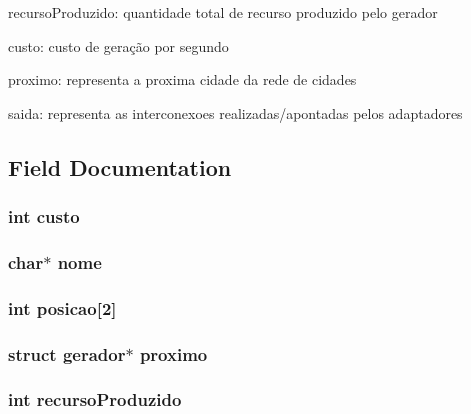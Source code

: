 recurso\-Produzido\-: quantidade total de recurso produzido pelo gerador

custo\-: custo de geração por segundo

proximo\-: representa a proxima cidade da rede de cidades

saida\-: representa as interconexoes realizadas/apontadas pelos adaptadores 

\subsection{Field Documentation}
\hypertarget{structgerador_a420b800f5434e6488ebc8a2b81d3b74b}{
\subsubsection[{custo}]{\setlength{\rightskip}{0pt plus 5cm}int custo}}\label{structgerador_a420b800f5434e6488ebc8a2b81d3b74b}
\hypertarget{structgerador_ae2a0f66178bb1c4d42e2b70ec9426ccb}{
\subsubsection[{nome}]{\setlength{\rightskip}{0pt plus 5cm}char$\ast$ nome}}\label{structgerador_ae2a0f66178bb1c4d42e2b70ec9426ccb}
\hypertarget{structgerador_a7e30d633898517077a4363ad6fade5b6}{
\subsubsection[{posicao}]{\setlength{\rightskip}{0pt plus 5cm}int posicao\mbox{[}2\mbox{]}}}\label{structgerador_a7e30d633898517077a4363ad6fade5b6}
\hypertarget{structgerador_afc2cefcafa0e3935e9e7641ef91e6b2d}{
\subsubsection[{proximo}]{\setlength{\rightskip}{0pt plus 5cm}struct {\bf gerador}$\ast$ proximo}}\label{structgerador_afc2cefcafa0e3935e9e7641ef91e6b2d}
\hypertarget{structgerador_a9e29959680201391763bfe25c54d3e7a}{
\subsubsection[{recurso\-Produzido}]{\setlength{\rightskip}{0pt plus 5cm}int recurso\-Produzido}}\label{structgerador_a9e29959680201391763bfe25c54d3e7a}

